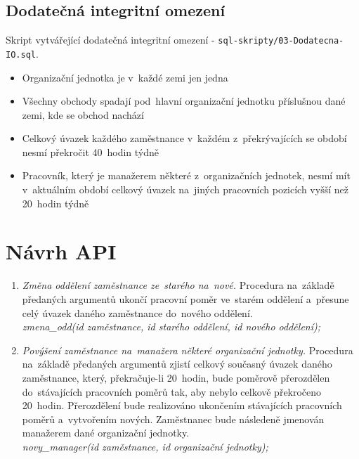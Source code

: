 \documentclass[a4paper,10pt]{article}
\begin{document}
\subsection*{Dodatečná integritní omezení}

\par Skript vytvářející dodatečná integritní
omezení - \texttt{sql-skripty/03-Dodatecna-IO.sql}.

\bigskip


\begin{itemize}
	\item{Organizační jednotka je v~každé zemi jen jedna}
	\item{Všechny obchody spadají pod~hlavní organizační jednotku příslušnou dané zemi,
	kde se obchod nachází}
	\item{Celkový úvazek každého zaměstnance v~každém z~překrývajících se období nesmí
	překročit 40~hodin týdně}
	\item{Pracovník, který je manažerem některé z~organizačních jednotek, nesmí mít
	v~aktuálním období celkový úvazek na~jiných pracovních pozicích vyšší než 20~hodin
	týdně}
\end{itemize}


\section{Návrh API }

\begin{enumerate}
\item{\emph{Změna oddělení zaměstnance ze~starého na~nové.} Procedura na~základě předaných
argumentů ukončí pracovní poměr ve~starém oddělení a~přesune celý úvazek daného
zaměstnance do~nového oddělení. \\
\emph{zmena\_odd(id zaměstnance, id starého oddělení, id nového oddělení);}\\
}

\item{\emph{Povýšení zaměstnance na~manažera některé organizační jednotky.} Procedura
na~základě předaných argumentů zjistí celkový současný úvazek daného zaměstnance, který,
překračuje-li 20~hodin, bude poměrově přerozdělen do~stávajících pracovních poměrů tak,
aby nebylo celkově překročeno 20~hodin. Přerozdělení bude realizováno ukončením
stávajících pracovních poměrů a~vytvořením nových. Zaměstnanec bude následeně jmenován
manažerem dané organizační jednotky. \\
\emph{novy\_manager(id zaměstnance, id organizační jednotky);}\\
}

\end{enumerate}
\end{document}
